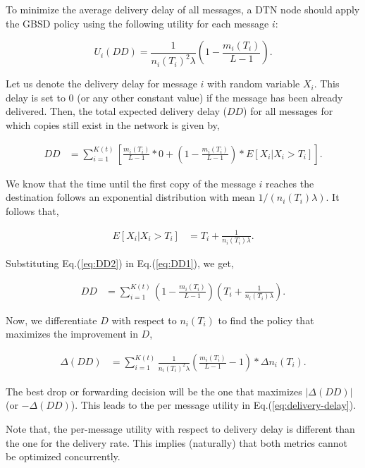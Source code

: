\begin{theorem} \label{th:delivery-delay}
To minimize the average delivery delay of all messages, a DTN node should apply the GBSD policy using the following utility for each message $i$:

\begin{equation}\label{eq:delivery-delay}
U_{i}(DD) = \frac{1}{n_i(T_i)^2 \lambda} ( 1-\frac{m_i(T_i)}{L-1}). \end{equation}
\end{theorem}

Let us denote the delivery delay for message $i$ with random variable $X_i$. This delay is set to $0$ (or any other constant value) if the message has been already delivered. Then, the total expected delivery delay ($DD$) for all messages for which copies still exist in the network is given by,

\small
\begin{align}\label{eq:DD1}
DD & = \sum_{i=1}^{K(t)} \left[\frac{m_i(T_i)}{L-1}*0 + (1 - \frac{m_i(T_i)}{L-1}) * E[X_i | X_i
> T_i]\right].
\end{align}
\normalsize

We know that the time until the first copy of the message $i$ reaches the destination follows an exponential distribution with mean $1/(n_i(T_i)\lambda)$. It follows that,

\begin{align}\label{eq:DD2}
E[X_i | X_i
> T_i] &= T_i + \frac{1}{n_i(T_i) \lambda}.
\end{align}

Substituting Eq.(\ref{eq:DD2}) in Eq.(\ref{eq:DD1}), we get,

\begin{align*}
DD &= \sum_{i=1}^{K(t)} (1 - \frac{m_i(T_i)}{L-1})(T_i + \frac{1}{n_i(T_i)
\lambda}).
\end{align*}

Now, we differentiate $D$ with respect to $n_i(T_i)$ to find the policy that maximizes the improvement in $D$,

\begin{align*}
\Delta(DD) &= \sum_{i=1}^{K(t)}{\frac{1}{n_i(T_i)^2 \lambda} ( \frac{m_i(T_i)}{L-1}-1)* \Delta n_i(T_i)}.
\end{align*}

The best drop or forwarding decision will be the one that maximizes $\vert\Delta(DD)\vert$ (or $-\Delta(DD)$). This leads to the per message utility in Eq.(\ref{eq:delivery-delay}).


Note that, the per-message utility with respect to delivery delay is different than the one for the delivery rate. This implies (naturally) that both metrics cannot be optimized concurrently.

